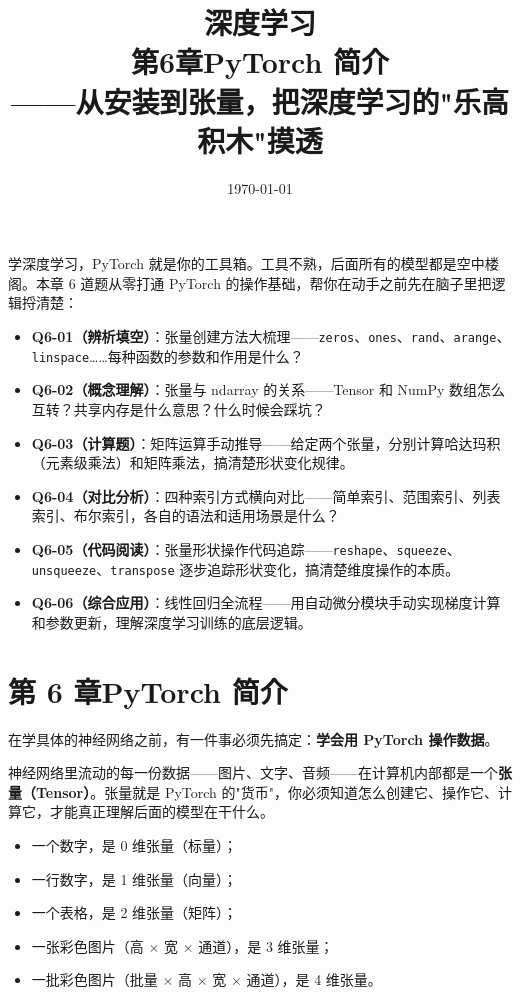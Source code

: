 \documentclass[a4paper,11pt]{ctexart}
\title{\textbf{深度学习\\第6章\quad PyTorch 简介}\\[0.5em]
{\large\color{gray}——从安装到张量，把深度学习的"乐高积木"摸透}}
\date{\today}
\begin{document}
\maketitle

\begin{beginnerbox}
    学深度学习，PyTorch 就是你的工具箱。工具不熟，后面所有的模型都是空中楼阁。本章 6 道题从零打通 PyTorch 的操作基础，帮你在动手之前先在脑子里把逻辑捋清楚：

    \begin{itemize}
        \item \textbf{Q6-01（辨析填空）}：张量创建方法大梳理——\texttt{zeros}、\texttt{ones}、\texttt{rand}、\texttt{arange}、\texttt{linspace}……每种函数的参数和作用是什么？
        \item \textbf{Q6-02（概念理解）}：张量与 ndarray 的关系——Tensor 和 NumPy 数组怎么互转？共享内存是什么意思？什么时候会踩坑？
        \item \textbf{Q6-03（计算题）}：矩阵运算手动推导——给定两个张量，分别计算哈达玛积（元素级乘法）和矩阵乘法，搞清楚形状变化规律。
        \item \textbf{Q6-04（对比分析）}：四种索引方式横向对比——简单索引、范围索引、列表索引、布尔索引，各自的语法和适用场景是什么？
        \item \textbf{Q6-05（代码阅读）}：张量形状操作代码追踪——\texttt{reshape}、\texttt{squeeze}、\texttt{unsqueeze}、\texttt{transpose} 逐步追踪形状变化，搞清楚维度操作的本质。
        \item \textbf{Q6-06（综合应用）}：线性回归全流程——用自动微分模块手动实现梯度计算和参数更新，理解深度学习训练的底层逻辑。
    \end{itemize}
\end{beginnerbox}

\section{第 6 章\quad PyTorch 简介}

在学具体的神经网络之前，有一件事必须先搞定：\textbf{学会用 PyTorch 操作数据}。

神经网络里流动的每一份数据——图片、文字、音频——在计算机内部都是一个\textbf{张量（Tensor）}。张量就是 PyTorch 的"货币"，你必须知道怎么创建它、操作它、计算它，才能真正理解后面的模型在干什么。

\begin{itemize}
    \item 一个数字，是 0 维张量（标量）；
    \item 一行数字，是 1 维张量（向量）；
    \item 一个表格，是 2 维张量（矩阵）；
    \item 一张彩色图片（高 $\times$ 宽 $\times$ 通道），是 3 维张量；
    \item 一批彩色图片（批量 $\times$ 高 $\times$ 宽 $\times$ 通道），是 4 维张量。
\end{itemize}
\end{document}
